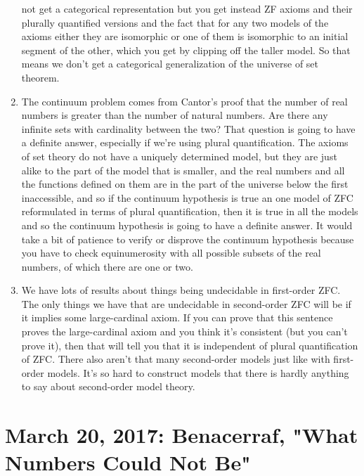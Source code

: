 \documentclass[12pt]{article}
\theoremstyle{definition}
\begin{document}
\begin{enumerate}
        not get a categorical representation but you get instead ZF axioms and
        their plurally quantified versions and the fact that for any two models
        of the axioms either they are isomorphic or one of them is isomorphic
        to an initial segment of the other, which you get by clipping off the
        taller model. So that means we don't get a categorical generalization
        of the universe of set theorem.
    \item
        The continuum problem comes from Cantor's proof that the number of real
        numbers is greater than the number of natural numbers. Are there any
        infinite sets with cardinality between the two? That question is going
        to have a definite answer, especially if we're using plural
        quantification. The axioms of set theory do not have a uniquely
        determined model, but they are just alike to the part of the model that
        is smaller, and the real numbers and all the functions defined on them
        are in the part of the universe below the first inaccessible, and so if
        the continuum hypothesis is true an one model of ZFC reformulated in
        terms of plural quantification, then it is true in all the models and
        so the continuum hypothesis is going to have a definite answer. It
        would take a bit of patience to verify or disprove the continuum
        hypothesis because you have to check equinumerosity with all possible
        subsets of the real numbers, of which there are one or two.
    \item
        We have lots of results about things being undecidable in first-order
        ZFC. The only things we have that are undecidable in second-order ZFC
        will be if it implies some large-cardinal axiom. If you can prove that
        this sentence proves the large-cardinal axiom and you think it's
        consistent (but you can't prove it), then that will tell you that it is
        independent of plural quantification of ZFC. There also aren't that
        many second-order models just like with first-order models. It's so
        hard to construct models that there is hardly anything to say about
        second-order model theory.
\end{enumerate}

\section{March 20, 2017: Benacerraf, "What Numbers Could Not Be"}
\end{document}
